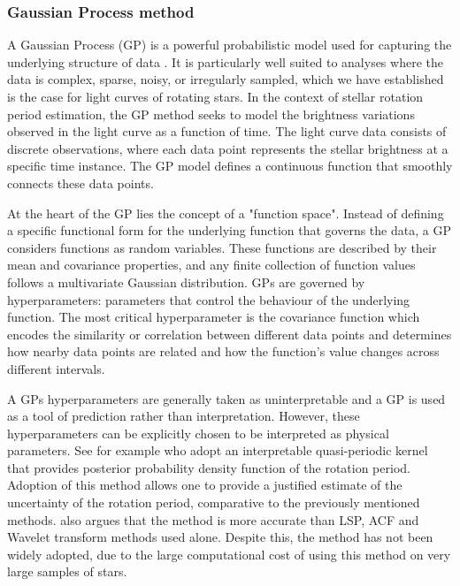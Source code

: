 \subsubsection*{Gaussian Process method}

A Gaussian Process (GP) is a powerful probabilistic model used for capturing the underlying structure of data \citep[see, e.g.,][]{williams_gaussian_1996, ebden_gaussian_2015,liu_when_2019}.
It is particularly well suited to analyses where the data is complex, sparse, noisy, or irregularly sampled, which we have established is the case for light curves of rotating stars.
In the context of stellar rotation period estimation, the GP method seeks to model the brightness variations observed in the light curve as a function of time. 
The light curve data consists of discrete observations, where each data point represents the stellar brightness at a specific time instance. 
The GP model defines a continuous function that smoothly connects these data points.

At the heart of the GP lies the concept of a "function space".
Instead of defining a specific functional form for the underlying function that governs the data, a GP considers functions as random variables. 
These functions are described by their mean and covariance properties, and any finite collection of function values follows a multivariate Gaussian distribution.
GPs are governed by hyperparameters: parameters that control the behaviour of the underlying function.
The most critical hyperparameter is the covariance function which encodes the similarity or correlation between different data points and determines how nearby data points are related and how the function's value changes across different intervals.

A GPs hyperparameters are generally taken as uninterpretable and a GP is used as a tool of prediction rather than interpretation.
However, these hyperparameters can be explicitly chosen to be interpreted as physical parameters.
See for example \citep{angus_inferring_2017} who adopt an interpretable quasi-periodic kernel that provides posterior probability density function of the rotation period.
Adoption of this method allows one to provide a justified estimate of the uncertainty of the rotation period, comparative to the previously mentioned methods.
\citet{angus_inferring_2017} also argues that the method is more accurate than LSP, ACF and Wavelet transform methods used alone.
Despite this, the method has not been widely adopted, due to the large computational cost of using this method on very large samples of stars.


